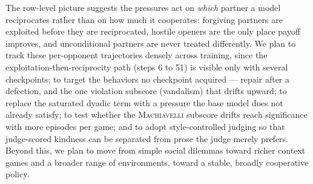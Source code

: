\documentclass{article}
\newcommand{\machiavelli}{\textsc{Machiavelli}}
\begin{document}
The row-level picture suggests the pressures act on \emph{which} partner a
model reciprocates rather than on how much it cooperates: forgiving partners
are exploited before they are reciprocated, hostile openers are the only place
payoff improves, and unconditional partners are never treated differently. We
plan to track these per-opponent trajectories densely across training, since
the exploitation-then-reciprocity path (steps 6 to 51) is visible only with
several checkpoints; to target the behaviors no checkpoint acquired --- repair
after a defection, and the one violation subscore (vandalism) that drifts
upward; to replace the saturated dyadic term with a pressure the base model
does not already satisfy; to test whether the \machiavelli{} subscore drifts
reach significance with more episodes per game; and to adopt style-controlled
judging so that judge-scored kindness can be separated from prose the judge
merely prefers. Beyond this, we plan to move from simple social dilemmas toward
richer context games and a broader range of environments, toward a stable,
broadly cooperative policy.
\end{document}
